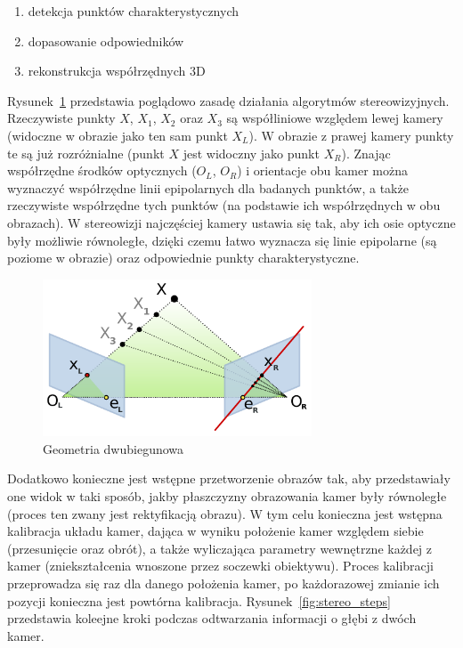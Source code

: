 \begin{enumerate}
\item detekcja punktów charakterystycznych
\item dopasowanie odpowiedników
\item rekonstrukcja współrzędnych 3D
\end{enumerate}

Rysunek~\ref{fig:epipolar} przedstawia poglądowo zasadę działania algorytmów
stereowizyjnych. Rzeczywiste punkty $X$, $X_1$, $X_2$ oraz $X_3$ są współliniowe
względem lewej kamery (widoczne w obrazie jako ten sam punkt $X_L$). W obrazie z
prawej kamery punkty te są już rozróżnialne (punkt $X$ jest widoczny jako punkt
$X_R$). Znając współrzędne środków optycznych ($O_L$, $O_R$) i orientacje obu
kamer można wyznaczyć współrzędne linii epipolarnych dla badanych punktów, a
także rzeczywiste współrzędne tych punktów (na podstawie ich współrzędnych w
obu obrazach). W stereowizji najczęściej kamery ustawia się tak, aby ich osie
optyczne były możliwie równoległe, dzięki czemu łatwo wyznacza się linie
epipolarne (są poziome w obrazie) oraz odpowiednie punkty charakterystyczne.

\begin{figure}[h!]
\centering
\includegraphics[width=8cm]{../../Common/img/Epipolar_geometry}
\caption{Geometria dwubiegunowa}
\label{fig:epipolar}
\end{figure}

Dodatkowo konieczne jest wstępne przetworzenie obrazów tak, aby przedstawiały
one widok w taki sposób, jakby płaszczyzny obrazowania kamer były równoległe
(proces ten zwany jest rektyfikacją obrazu). W tym celu konieczna jest wstępna
kalibracja układu kamer, dająca w wyniku położenie kamer względem siebie
(przesunięcie oraz obrót), a także wyliczająca parametry wewnętrzne każdej z
kamer (zniekształcenia wnoszone przez soczewki obiektywu). Proces kalibracji
przeprowadza się raz dla danego położenia kamer, po każdorazowej zmianie ich
pozycji konieczna jest powtórna kalibracja. Rysunek~\ref{fig:stereo_steps}
przedstawia koleejne kroki podczas odtwarzania informacji o głębi z dwóch kamer.

